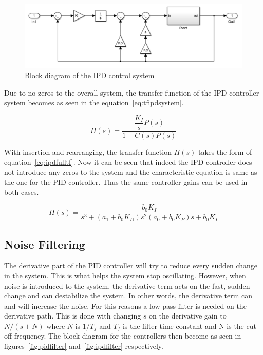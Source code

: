 \begin{figure}[!h]
	\centering
	\includegraphics[width=.85\linewidth]{graphics/ipdcontroller}
	\caption{Block diagram of the IPD control system}
	\label{fig:ipdcontrolsystem}	
\end{figure}

Due to no zeros to the overall system, the transfer function of the IPD controller system becomes as seen in the equation~\ref{eq:tfipdsystem}.

\begin{equation}
\label{eq:tfipdsystem}
H(s) = \dfrac{\dfrac{K_I}{s} P(s)}{1+C(s)P(s)}
\end{equation}

With insertion and rearranging, the transfer function $H(s)$ takes the form of equation~\ref{eq:ipdfulltf}. Now it can be seen that indeed the IPD controller does not introduce any zeros to the system and the characteristic equation is same as the one for the PID controller. Thus the same controller gains can be used in both cases.

\begin{equation}
\label{eq:ipdfulltf}
H(s) = \dfrac{b_0 K_I}{s^3 + (a_1 + b_0 K_D)s^2 (a_0 + b_0 K_P)s + b_0 K_I }
\end{equation}

\subsection{Noise Filtering}

The derivative part of the PID controller will try to reduce every sudden change in the system. This is what helps the system stop oscillating. However, when noise is introduced to the system, the derivative term acts on the fast, sudden change and can destabilize the system. In other words, the derivative term can and will increase the noise. For this reasons a low pass filter is needed on the derivative path. This is done with changing $s$ on the derivative gain to $N/(s + N)$ where $N$ is $1/T_f$ and $T_f$ is the filter time constant and N is the cut off frequency. The block diagram for the controllers then become as seen in figures~\ref{fig:pidfilter} and~\ref{fig:ipdfilter} respectively.

